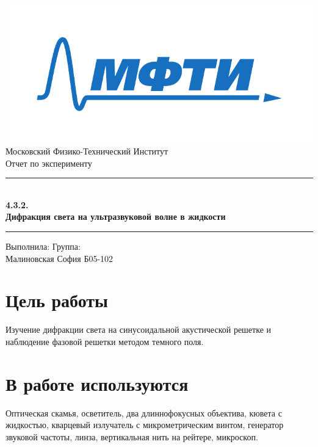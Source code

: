 \documentclass[a4paper,12pt]{article}
\begin{document}
\begin{titlepage}
		\vspace*{\fill}
		
		\begin{center}
			\includegraphics[scale=0.8]{MIPT.pdf}
			\\[0.7cm]\Huge Московский Физико-Технический Институт
			\\[2cm]\LARGE Отчет по эксперименту
			\\[0.5cm]\noindent\rule{\textwidth}{1pt}
			\\\Huge\textbf{4.3.2. \\ Дифракция света на ультразвуковой волне в жидкости}
			\\[-0.5cm]\noindent\rule{\textwidth}{1pt}
		\end{center}
		
		\vspace*{\fill}
		
		\begin{flushleft}
			Выполнила: \hspace{\fill} Группа:
			\\Малиновская София \hspace{\fill} Б05-102
		\end{flushleft}
	\end{titlepage}

	\setcounter{page}{2}


\section*{Цель работы}
Изучение дифракции света на синусоидальной акустической решетке и наблюдение фазовой решетки методом темного поля.


\section*{В работе используются} 
Оптическая скамья, осветитель, два длиннофокусных объектива, кювета с жидкостью, кварцевый излучатель с микрометрическим винтом, генератор звуковой частоты, линза, вертикальная нить на рейтере, микроскоп.
\end{document}
